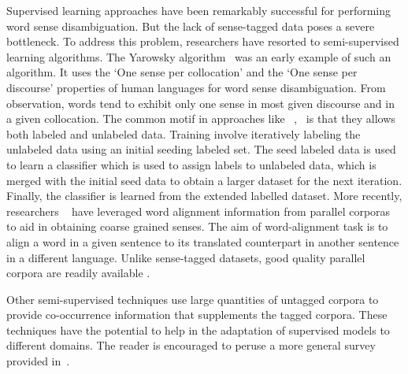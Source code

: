 \documentclass[11pt,letterpaper]{article}
\begin{document}
Supervised learning approaches have been remarkably successful for performing word sense disambiguation. But the lack of sense-tagged data poses a severe bottleneck. To address this problem, researchers have resorted to semi-supervised learning algorithms. The Yarowsky algorithm~\cite{yarowsky1995unsupervised} was an early example of such an algorithm. It uses the `One sense per collocation' and the `One sense per discourse' properties of human languages for word sense disambiguation. From observation, words tend to exhibit only one sense in most given discourse and in a given collocation. The common motif in approaches like ~\cite{yarowsky1995unsupervised},~\cite{le2008semi} is that they allows both labeled and unlabeled data. Training involve iteratively labeling the unlabeled data using an initial seeding labeled set. The seed labeled data is used to learn a classifier which is used to assign labels to unlabeled data, which is merged with the initial seed data to obtain a larger dataset for the next iteration. Finally, the classifier is learned from the extended labelled dataset.
More recently, researchers ~\cite{Ng} have leveraged word alignment information from parallel corporas to aid in obtaining coarse grained senses. The aim of word-alignment task is to align a word in a given sentence to its translated counterpart in another sentence in a different language. Unlike sense-tagged datasets, good quality parallel corpora are readily available . 


Other semi-supervised techniques use large quantities of untagged corpora to provide co-occurrence information that supplements the tagged corpora. These techniques have the potential to help in the adaptation of supervised models to different domains. The reader is encouraged to peruse a more general  survey provided in~\cite{navigli2009word}. 
\end{document}
